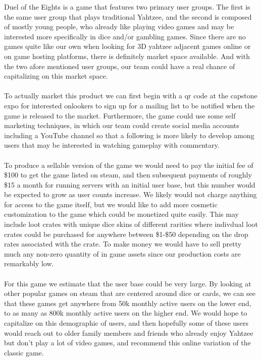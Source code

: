\documentclass{article}
\begin{document}
Duel of the Eights is a game that features two primary user groups. The first is the same user group that plays traditional Yahtzee, and the second is composed of mostly young people, who already like playing video games and may be interested more specifically in dice and/or gambling games. Since there are no games quite like our own when looking for 3D yahtzee adjacent games online or on game hosting platforms, there is definitely market space available. And with the two afore mentioned user groups, our team could have a real chance of capitalizing on this market space.
\\
\\
To actually market this product we can first begin with a qr code at the capstone expo for interested onlookers to sign up for a mailing list to be notified when the game is released to the market. Furthermore, the game could use some self marketing techniques, in which our team could create social media accounts including a YouTube channel so that a following is more likely to develop among users that may be interested in watching gameplay with commentary.
\\
\\
To produce a sellable version of the game we would need to pay the initial fee of \$100 to get the game listed on steam, and then subsequent payments of roughly \$15 a month for running servers with an initial user base, but this number would be expected to grow as user counts increase. We likely would not charge anything for access to the game itself, but we would like to add more cosmetic customization to the game which could be monetized quite easily. This may include loot crates with unique dice skins of different rarities where indivdual loot crates could be purchased for anywhere between \$1-\$50 depending on the drop rates associated with the crate. To make money we would have to sell pretty much any non-zero quantity of in game assets since our production costs are remarkably low.
\\
\\
For this game we estimate that the user base could be very large. By looking at other popular games on steam that are centered around dice or cards, we can see that these games get anywhere from 50k monthly active users on the lower end, to as many as 800k monthly active users on the higher end. We would hope to capitalize on this demographic of users, and then hopefully some of these users would reach out to older family members and friends who already enjoy Yahtzee but don't play a lot of video games, and recommend this online variation of the classic game.
\end{document}
